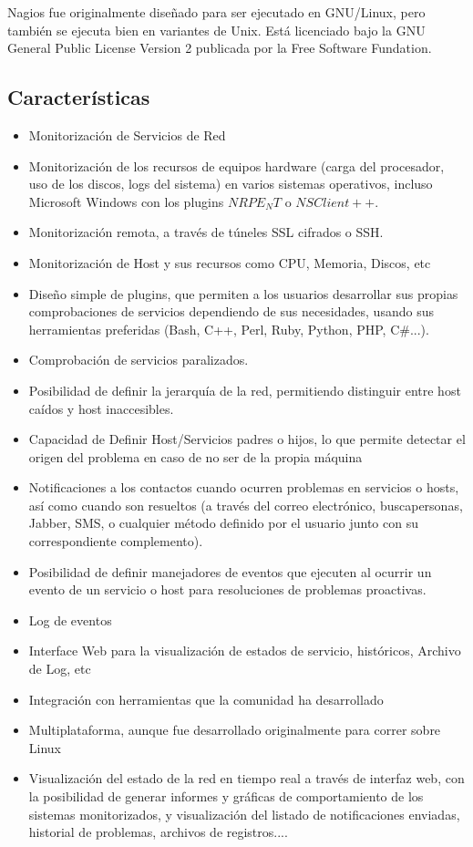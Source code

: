 \documentclass[11pt,a4paper]{article}
\begin{document}
    Nagios\cite{web} fue originalmente diseñado para ser ejecutado en GNU/Linux, pero también se ejecuta bien en variantes de Unix. Está licenciado bajo la GNU General Public License Version 2 publicada por la Free Software Fundation.
    
\subsection{Características}
\begin{itemize}

\item Monitorización de Servicios de Red
\item Monitorización de los recursos de equipos hardware (carga del procesador, uso de los discos, logs del sistema) en varios sistemas operativos, incluso Microsoft Windows con los plugins $NRPE_NT$ o $NSClient++$.
\item Monitorización remota, a través de túneles SSL cifrados o SSH.
\item Monitorización de Host y sus recursos como CPU, Memoria, Discos, etc
\item Diseño simple de plugins, que permiten a los usuarios desarrollar sus propias comprobaciones de servicios dependiendo de sus necesidades, usando sus herramientas preferidas (Bash, C++, Perl, Ruby, Python, PHP, C\#...).
\item Comprobación de servicios paralizados.
\item Posibilidad de definir la jerarquía de la red, permitiendo distinguir entre host caídos y host inaccesibles.
\item Capacidad de Definir Host/Servicios padres o hijos, lo que permite detectar el origen del problema en caso de no ser de la propia máquina 
\item Notificaciones a los contactos cuando ocurren problemas en servicios o hosts, así como cuando son resueltos (a través del correo electrónico, buscapersonas, Jabber, SMS, o cualquier método definido por el usuario junto con su correspondiente complemento).
\item Posibilidad de definir manejadores de eventos que ejecuten al ocurrir un evento de un servicio o host para resoluciones de problemas proactivas.
\item Log de eventos
\item Interface Web para la visualización de estados de servicio, históricos, Archivo de Log, etc
\item Integración con herramientas que la comunidad ha desarrollado
\item Multiplataforma, aunque fue desarrollado originalmente para correr sobre Linux
\item Visualización del estado de la red en tiempo real a través de interfaz web, con la posibilidad de generar informes y gráficas de comportamiento de los sistemas monitorizados, y visualización del listado de notificaciones enviadas, historial de problemas, archivos de registros....

\end{itemize}
\end{document}
